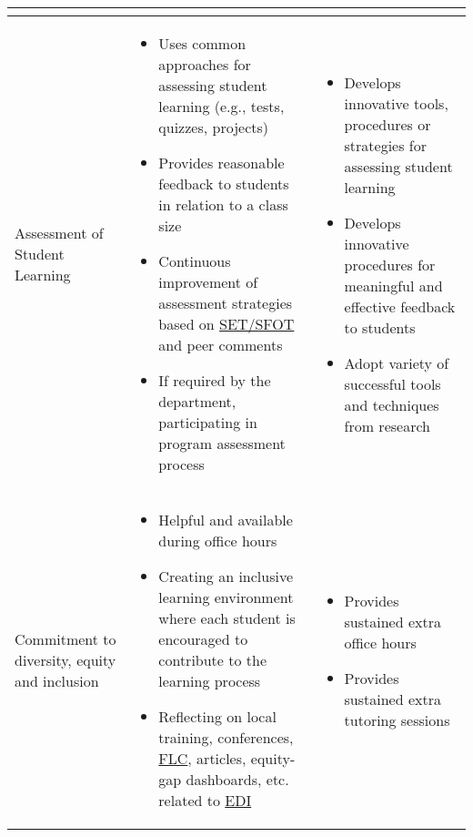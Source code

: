\documentclass{scrartcl}
\begin{document}
\begin{longtable}{p{2cm}p{6cm}P{6cm}}
\begin{itemize}[noitemsep,leftmargin=*,topsep=0pt,partopsep=0pt]
    \end{itemize}\\ 
\hline
Assessment of Student Learning
 & \vspace{-\baselineskip}%
  \begin{itemize}[noitemsep,leftmargin=*,topsep=0pt,partopsep=0pt]
        \item Uses common approaches for assessing student learning (e.g., tests, quizzes, projects)
        \item Provides reasonable feedback to students in relation to a class size     
        \item Continuous improvement of assessment strategies based on \href{https://www.csuchico.edu/ir/sfot/}{SET/SFOT} and peer comments
        \item If required by the department, participating in program assessment process
    \end{itemize}
  & %
    \begin{itemize}[noitemsep,leftmargin=*,topsep=0pt,partopsep=0pt]
        \item Develops innovative tools, procedures or strategies for assessing student learning
        \item Develops innovative procedures for meaningful and effective feedback to students
        \item Adopt variety of successful tools and techniques from research
     \end{itemize}\\ 
\hline
Commitment to diversity, equity and inclusion
 & \vspace{-\baselineskip}%
  \begin{itemize}[noitemsep,leftmargin=*,topsep=0pt,partopsep=0pt]
        \item Helpful and available during office hours
        \item Creating an inclusive learning environment where each student is encouraged to contribute to the learning process
        \item Reflecting on local training, conferences, \href{https://www.csuchico.edu/fdev/homepage/flcs.shtml}{FLC}, articles, equity-gap dashboards, etc. related to \href{https://www.csuchico.edu/diversity/}{EDI}       
    \end{itemize}
  & %
    \begin{itemize}[noitemsep,leftmargin=*,topsep=0pt,partopsep=0pt]
        \item Provides sustained extra office hours
        \item Provides sustained extra tutoring sessions

\end{itemize}
\end{longtable}
\end{document}
